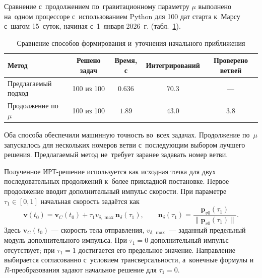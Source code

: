 Сравнение с~продолжением по~гравитационному параметру $\mu$ выполнено на~одном процессоре с~использованием Python для 100 дат старта к~Марсу с~шагом 15~суток, начиная с~1~января 2026~г. (табл.~\ref{tab:syn-method-comparison}).

\begin{table}[htbp]
    \centering
    \caption{Сравнение способов формирования и~уточнения начального приближения}
    \label{tab:syn-method-comparison}
    \small
    \begin{tabular}{@{}lcccc@{}}
        \toprule
        Метод & Решено задач & Время, с & Интегрирований & Проверено ветвей \\
        \midrule
        Предлагаемый подход & 100 из 100 & $0.636$ & $70.3$ & --- \\
        Продолжение по~$\mu$ & 100 из 100 & $1.89$ & $43.0$ & $3.8$ \\
        \bottomrule
    \end{tabular}
\end{table}

\FloatBarrier
Оба способа обеспечили машинную точность во~всех задачах. Продолжение по~$\mu$ запускалось для нескольких номеров ветви с~последующим выбором лучшего решения. Предлагаемый метод не~требует заранее задавать номер ветви.

Полученное ИРТ-решение используется как исходная точка для двух последовательных продолжений к~более прикладной постановке. Первое продолжение вводит дополнительный импульс скорости. При параметре $\tau_1\in[0,1]$ начальная скорость задаётся как
\begin{equation}
    \mathbf v(t_0)=\mathbf v_C(t_0)
    +\tau_1v_{\delta,\max}\mathbf n_\delta(\tau_1),
    \qquad
    \mathbf n_\delta(\tau_1)=
    \frac{\mathbf p_{v0}(\tau_1)}{\lVert\mathbf p_{v0}(\tau_1)\rVert}.
    \label{eq:syn-vdelta-continuation}
\end{equation}
Здесь $\mathbf v_C(t_0)$ --- скорость тела отправления, $v_{\delta,\max}$ --- заданный предельный модуль дополнительного импульса. При $\tau_1=0$ дополнительный импульс отсутствует; при $\tau_1=1$ достигается его предельное значение. Направление выбирается согласованно с~условием трансверсальности, а~конечные формулы и~$R$-преобразования задают начальное решение для $\tau_1=0$.

